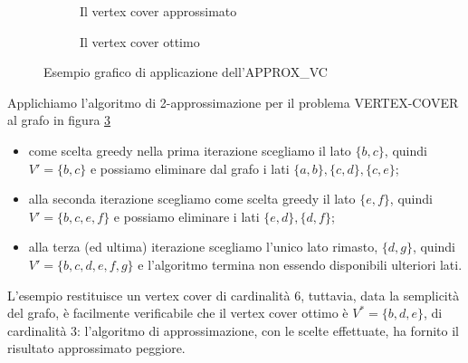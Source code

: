 \begin{esempio}
\begin{figure}
\begin{subfigure}{.5\textwidth}
	\label{fig:approxvce}
	\caption{Il vertex cover approssimato}
\end{subfigure}
\begin{subfigure}{.5\textwidth}
	\centering
	\label{fig:approxvcf}
	\caption{Il vertex cover ottimo}
\end{subfigure}
\caption{Esempio grafico di applicazione dell'APPROX\_VC}
\label{fig:esempio_approx_vc}
\end{figure}

Applichiamo l'algoritmo di 2-approssimazione per il problema VERTEX-COVER al grafo in figura \ref{fig:esempio_approx_vc}
\begin{itemize}
\item come scelta greedy nella prima iterazione scegliamo il lato $\{b,c\}$, quindi $V'=\{b,c\}$ e possiamo eliminare dal grafo i lati $\{a,b\}, \{c,d\}, \{c,e\}$;
\item alla seconda iterazione scegliamo come scelta greedy il lato $\{e,f\}$, quindi $V'=\{b,c,e,f\}$ e possiamo eliminare i lati $\{e,d\}, \{d,f\}$;
\item alla terza (ed ultima) iterazione scegliamo l'unico lato rimasto, $\{d,g\}$, quindi $V'=\{b,c,d,e,f,g\}$ e l'algoritmo termina non essendo disponibili ulteriori lati.
\end{itemize}

L'esempio restituisce un vertex cover di cardinalità $6$, tuttavia, data la semplicità del grafo, è facilmente verificabile che il vertex cover ottimo è $V^*=\{b,d,e\}$, di cardinalità $3$: l'algoritmo di approssimazione, con le scelte effettuate, ha fornito il risultato approssimato peggiore.
\end{esempio}

